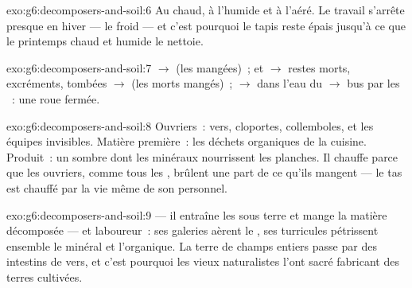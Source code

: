\begin{solution}{exo:g6:decomposers-and-soil:6}
Au chaud, à l'humide et à l'aéré. Le travail s'arrête presque en
hiver --- le froid --- et c'est pourquoi le tapis reste épais
jusqu'à ce que le printemps chaud et humide le nettoie.
\end{solution}

\begin{solution}{exo:g6:decomposers-and-soil:7}
 $\rightarrow$  (les  mangées)~;
 et  $\rightarrow$ restes morts, excréments,
 tombées $\rightarrow$  (les morts mangés)~;
 $\rightarrow$  dans l'eau du 
$\rightarrow$ bus par les ~: une roue fermée.
\end{solution}

\begin{solution}{exo:g6:decomposers-and-soil:8}
Ouvriers~: vers, cloportes, collemboles,  et les équipes
invisibles. Matière première~: les déchets organiques de la cuisine.
Produit~: un  sombre dont les minéraux nourrissent les
planches. Il chauffe parce que les ouvriers, comme tous les
, brûlent une part de ce qu'ils mangent --- le tas est
chauffé par la vie même de son personnel.
\end{solution}

\begin{solution}{exo:g6:decomposers-and-soil:9}
 --- il entraîne les  sous terre et mange la
matière décomposée --- et laboureur~: ses galeries aèrent le ,
ses turricules pétrissent ensemble le minéral et l'organique. La
terre de champs entiers passe par des intestins de vers, et c'est
pourquoi les vieux naturalistes l'ont sacré fabricant des terres
cultivées.
\end{solution}

